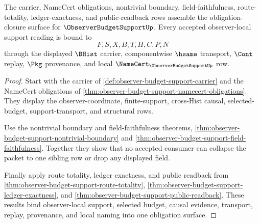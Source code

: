 \begin{theorem}
\label{thm:observer-budget-support-obligation-closure-package}
The carrier, NameCert obligations, nontrivial boundary, field-faithfulness, route-totality, ledger-exactness, and public-readback rows assemble the obligation-closure surface for $\ObserverBudgetSupportUp$. Every accepted observer-local support reading is bound to
$$
F,S,X,B,T,H,C,P,N
$$
through the displayed $\BHist$ carrier, componentwise $\hsame$ transport, $\Cont$ replay, $\Pkg$ provenance, and local $\NameCert_{\ObserverBudgetSupportUp}$ row.
\end{theorem}
\begin{proof}
Start with the carrier of \autoref{def:observer-budget-support-carrier} and the NameCert obligations of \autoref{thm:observer-budget-support-namecert-obligations}. They display the observer-coordinate, finite-support, cross-Hist causal, selected-budget, support-transport, and structural rows.

Use the nontrivial boundary and field-faithfulness theorems, \autoref{thm:observer-budget-support-nontrivial-boundary} and \autoref{thm:observer-budget-support-field-faithfulness}. Together they show that no accepted consumer can collapse the packet to one sibling row or drop any displayed field.

Finally apply route totality, ledger exactness, and public readback from \autoref{thm:observer-budget-support-route-totality}, \autoref{thm:observer-budget-support-ledger-exactness}, and \autoref{thm:observer-budget-support-public-readback}. These results bind observer-local support, selected budget, causal evidence, transport, replay, provenance, and local naming into one obligation surface.
\end{proof}

